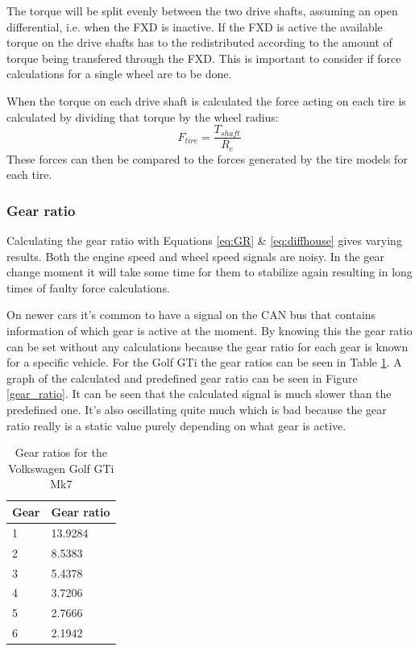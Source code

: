 The torque will be split evenly between the two drive shafts, assuming an open differential, i.e. when the FXD is inactive. If the FXD is active the available torque on the drive shafts has to the redistributed according to the amount of torque being transfered through the FXD. This is important to consider if force calculations for a single wheel are to be done. 

When the torque on each drive shaft is calculated the force acting on each tire is calculated by dividing that torque by the wheel radius:
\begin{equation}
\label{eq:tireforce}
F_{tire} = \frac{T_{shaft}}{R_{e}}
\end{equation}
These forces can then be compared to the forces generated by the tire models for each tire.

\subsubsection{Gear ratio}
Calculating the gear ratio with Equations \ref{eq:GR} \& \ref{eq:diffhouse} gives varying results. Both the engine speed and wheel speed signals are noisy. In the gear change moment it will take some time for them to stabilize again resulting in long times of faulty force calculations. 

On newer cars it's common to have a signal on the CAN bus that contains information of which gear is active at the moment. By knowing this the gear ratio can be set without any calculations because the gear ratio for each gear is known for a specific vehicle. For the Golf GTi the gear ratios can be seen in Table \ref{tab:gr}. A graph of the calculated and predefined gear ratio can be seen in Figure \ref{gear_ratio}. It can be seen that the calculated signal is much slower than the predefined one. It's also oscillating quite much which is bad because the gear ratio really is a static value purely depending on what gear is active. 


\begin{table}[position specifier]
	\centering
	\begin{tabular}{| l | l |}
		\hline
		Gear & Gear ratio \\ \hline
		1 & 13.9284 \\ \hline
		2 & 8.5383 \\ \hline
		3 & 5.4378 \\ \hline
		4 & 3.7206 \\ \hline
		5 & 2.7666 \\ \hline
		6 & 2.1942 \\ \hline
	\end{tabular}
	\caption{Gear ratios for the Volkswagen Golf GTi Mk7}
	\label{tab:gr}
\end{table}

